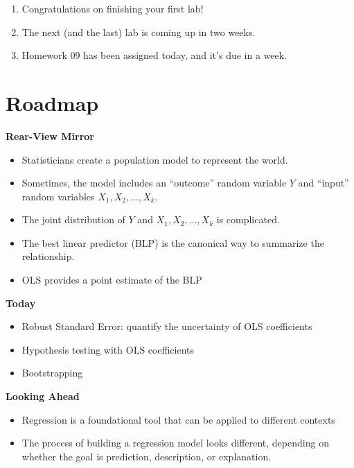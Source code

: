 \documentclass[
]{book}
\providecommand{\tightlist}{%
  \setlength{\itemsep}{0pt}\setlength{\parskip}{0pt}}
\theoremstyle{definition}
\theoremstyle{definition}
\theoremstyle{definition}
\theoremstyle{definition}
\theoremstyle{remark}
\begin{document}
\begin{enumerate}
\def\labelenumi{\arabic{enumi}.}
\tightlist
\item
  Congratulations on finishing your first lab!
\item
  The next (and the last) lab is coming up in two weeks.
\item
  Homework 09 has been assigned today, and it's due in a week.
\end{enumerate}

\hypertarget{roadmap-5}{%
\section{Roadmap}\label{roadmap-5}}

\textbf{Rear-View Mirror}

\begin{itemize}
\tightlist
\item
  Statisticians create a population model to represent the world.
\item
  Sometimes, the model includes an ``outcome'' random variable \(Y\) and ``input'' random variables \(X_1, X_2,...,X_k\).
\item
  The joint distribution of \(Y\) and \(X_1, X_2,...,X_k\) is complicated.
\item
  The best linear predictor (BLP) is the canonical way to summarize the relationship.
\item
  OLS provides a point estimate of the BLP
\end{itemize}

\textbf{Today}

\begin{itemize}
\tightlist
\item
  Robust Standard Error: quantify the uncertainty of OLS coefficients
\item
  Hypothesis testing with OLS coefficients
\item
  Bootstrapping
\end{itemize}

\textbf{Looking Ahead}

\begin{itemize}
\tightlist
\item
  Regression is a foundational tool that can be applied to different contexts
\item
  The process of building a regression model looks different, depending on whether the goal is prediction, description, or explanation.
\end{itemize}
\end{document}
